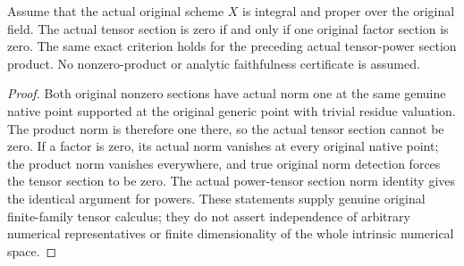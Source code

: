 \begin{theorem}
\label{thm:scheme-global-section-tensor-nonzero}
\leanok
{}
Assume that the actual original scheme $X$ is integral and proper over the
original field. The actual tensor section is zero if and only if one original
factor section is zero. The same exact criterion holds for the preceding
actual tensor-power section product. No nonzero-product or analytic
faithfulness certificate is assumed.
\end{theorem}
\begin{proof}
Both original nonzero sections have actual norm one at the same genuine
native point supported at the original generic point with trivial residue
valuation. The product norm is therefore one there, so the actual tensor
section cannot be zero. If a factor is zero, its actual norm vanishes at
every original native point; the product norm vanishes everywhere, and true
original norm detection forces the tensor section to be zero. The actual
power-tensor section norm identity gives the identical argument for powers.
These statements supply genuine original finite-family tensor calculus;
they do not assert independence of arbitrary numerical representatives or
finite dimensionality of the whole intrinsic numerical space.
\end{proof}
